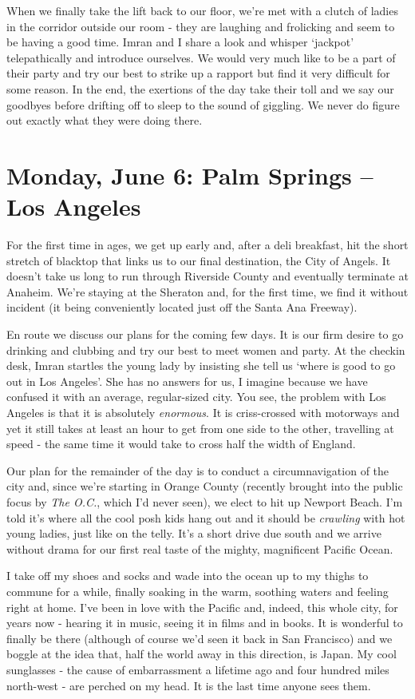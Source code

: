 \documentclass[a5paper,titlepage,11pt]{book}
\begin{document}
When we finally take the lift back to our floor, we're met with a clutch of ladies in the corridor outside our room - they are laughing and frolicking and seem to be having a good time. Imran and I share a look and whisper `jackpot' telepathically and introduce ourselves. We would very much like to be a part of their party and try our best to strike up a rapport but find it very difficult for some reason. In the end, the exertions of the day take their toll and we say our goodbyes before drifting off to sleep to the sound of giggling. We never do figure out exactly what they were doing there.

\chapter[Palm Springs -- Los Angeles]{Monday, June 6:  Palm Springs -- Los Angeles}
For the first time in ages, we get up early and, after a deli breakfast, hit the short stretch of blacktop that links us to our final destination, the City of Angels. It doesn't take us long to run through Riverside County and eventually terminate at Anaheim. We're staying at the Sheraton and, for the first time, we find it without incident (it being conveniently located just off the Santa Ana Freeway).

En route we discuss our plans for the coming few days. It is our firm desire to go drinking and clubbing and try our best to meet women and party. At the checkin desk, Imran startles the young lady by insisting she tell us `where is good to go out in Los Angeles'. She has no answers for us, I imagine because we have confused it with an average, regular-sized city. You see, the problem with Los Angeles is that it is absolutely \emph{enormous}. It is criss-crossed with motorways and yet it still takes at least an hour to get from one side to the other, travelling at speed - the same time it would take to cross half the width of England.

Our plan for the remainder of the day is to conduct a circumnavigation of the city and, since we're starting in Orange County (recently brought into the public focus by \emph{The O.C.}, which I'd never seen), we elect to hit up Newport Beach. I'm told it's where all the cool posh kids hang out and it should be \emph{crawling} with hot young ladies, just like on the telly. It's a short drive due south and we arrive without drama for our first real taste of the mighty, magnificent Pacific Ocean.

I take off my shoes and socks and wade into the ocean up to my thighs to commune for a while, finally soaking in the warm, soothing waters and feeling right at home. I've been in love with the Pacific and, indeed, this whole city, for years now - hearing it in music, seeing it in films and in books. It is wonderful to finally be there (although of course we'd seen it back in San Francisco) and we boggle at the idea that, half the world away in this direction, is Japan. My cool sunglasses - the cause of embarrassment a lifetime ago and four hundred miles north-west - are perched on my head. It is the last time anyone sees them.
\end{document}
